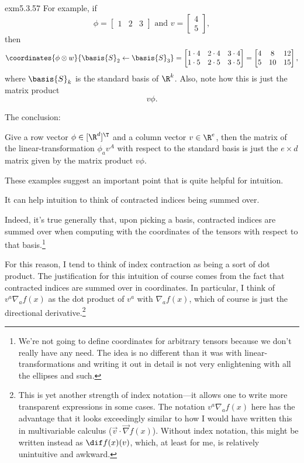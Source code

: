 \begin{exm}{}{exm5.3.57}
	For example, if
	\begin{equation}
		\phi =\begin{bmatrix}1 & 2 & 3\end{bmatrix}\text{ and }v=\begin{bmatrix}4 \\ 5\end{bmatrix},
	\end{equation}
	then
	\begin{equation}
		\coordinates{\phi \otimes w}{\basis{S}_2\leftarrow \basis{S}_3}=\begin{bmatrix}1\cdot 4 & 2\cdot 4 & 3\cdot 4 \\ 1\cdot 5 & 2\cdot 5 & 3\cdot 5\end{bmatrix}=\begin{bmatrix}4 & 8 & 12 \\ 5 & 10 & 15\end{bmatrix},
	\end{equation}
	where $\basis{S}_k$ is the standard basis of $\R ^k$.  Also, note how this is just the matrix product
	\begin{equation}
		v\phi .
	\end{equation}
	
	The conclusion:
	\begin{important}
		Give a row vector $\phi \in [\R ^d]^{\T}$ and a column vector $v\in \R ^e$, then the matrix of the linear-transformation $\phi _av^A$ with respect to the standard basis is just the $e\times d$ matrix given by the matrix product $v\phi$.
	\end{important}
\end{exm}

These examples suggest an important point that is quite helpful for intuition.
\begin{important}
	It can help intuition to think of contracted indices being summed over.
\end{important}
Indeed, it's true generally that, upon picking a basis, contracted indices are summed over when computing with the coordinates of the tensors with respect to that basis.\footnote{We're not going to define coordinates for arbitrary tensors because we don't really have any need.  The idea is no different than it was with linear-transformations and writing it out in detail is not very enlightening with all the ellipses and such.}

For this reason, I tend to think of index contraction as being a sort of dot product.  The justification for this intuition of course comes from the fact that contracted indices are summed over in coordinates.  In particular, I think of $v^a\nabla _af(x)$ as the dot product of $v^a$ with $\nabla _af(x)$, which of course is just the directional derivative.\footnote{This is yet another strength of index notation---it allows one to write more transparent expressions in some cases.  The notation $v^a\nabla _af(x)$ here has the advantage that it looks exceedingly similar to how I would have written this in multivariable calculus ($\vec{v}\cdot \vec{\nabla}f(x)$).  Without index notation, this might be written instead as $\dif f(x)(v)$, which, at least for me, is relatively unintuitive and awkward.}

